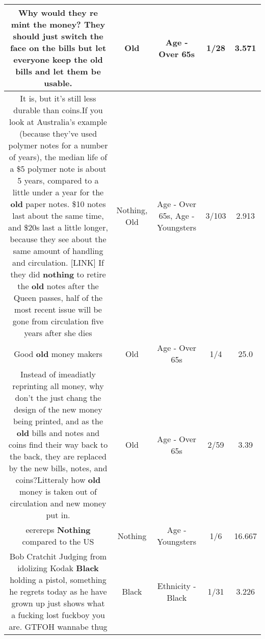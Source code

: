 \documentclass[11pt]{article}
\newlength\mylength
\begin{document}
\begin{center}
\begin{longtable}{|C{.65\mylength}|C{.30\mylength}|C{.12\mylength}|C{.12\mylength}|C{.12\mylength}|}
  \small Why would they re mint the money? They should just switch the face on the  bills but let everyone keep the \textbf{old} bills and let them be usable.\normalsize   & Old & Age - Over 65s & 1/28 & 3.571 \\  \hline
  \small It is, but it's still less durable than coins.If you look at Australia's example (because they've used polymer notes for a number of years), the median life of a \$5 polymer note is about 5 years, compared to a little under a year for the \textbf{old} paper notes. \$10 notes last about the same time, and \$20s last a little longer, because they see about the same amount of handling and circulation.  [LINK] If they did \textbf{nothing} to retire the \textbf{old} notes after the Queen passes, half of the most recent issue will be gone from circulation five years after she dies\normalsize   & Nothing, Old & Age - Over 65s, Age - Youngsters & 3/103 & 2.913 \\  \hline
  \small Good \textbf{old} money makers\normalsize   & Old & Age - Over 65s & 1/4 & 25.0 \\  \hline
  \small Instead of imeadiatly reprinting all money, why don't the just chang the design of the new money being printed, and as the \textbf{old} bills and notes and coins find their way back to the back, they are replaced by the new bills, notes, and coins?Litteraly how \textbf{old} money is taken out of circulation and new money put in.\normalsize   & Old & Age - Over 65s & 2/59 & 3.39 \\  \hline
  \small eerereps \textbf{Nothing} compared to the US\normalsize   & Nothing & Age - Youngsters & 1/6 & 16.667 \\  \hline
  \small Bob Cratchit Judging from idolizing Kodak \textbf{Black} holding a pistol, something he regrets today as he have grown up just shows what a fucking lost fuckboy you are. GTFOH wannabe thug\normalsize   & Black & Ethnicity - Black & 1/31 & 3.226 \\  \hline

\end{longtable}
\end{center}
\end{document}
